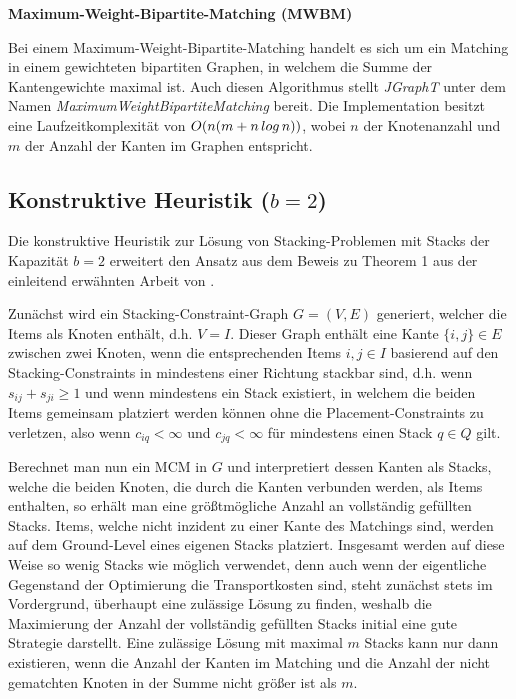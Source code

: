 \vfill
\pagebreak

\textbf{Maximum-Weight-Bipartite-Matching (MWBM)}

Bei einem Maximum-Weight-Bipartite-Matching handelt es sich um ein Matching in einem gewichteten bipartiten Graphen,
in welchem die Summe der Kantengewichte maximal ist. Auch diesen Algorithmus stellt \textit{JGraphT} \cite{JGraphT}
unter dem Namen \textit{MaximumWeightBipartiteMatching} bereit.
Die Implementation besitzt eine Laufzeitkomplexität von $O(n (m + n \thinspace log \thinspace n))$, wobei $n$ der Knotenanzahl
und $m$ der Anzahl der Kanten im Graphen entspricht.

\subsection{Konstruktive Heuristik ($b = 2$)}
\label{sec:two_cap_heuristic}

Die konstruktive Heuristik zur Lösung von Stacking-Problemen mit Stacks der Kapazität $b=2$ erweitert den Ansatz aus dem Beweis
zu Theorem 1 aus der einleitend erwähnten Arbeit von \citet{Bruns2015}.

Zunächst wird ein Stacking-Constraint-Graph $G = (V, E)$ generiert, welcher die Items als Knoten enthält, d.h. $V = I$. Dieser Graph
enthält eine Kante $\{i, j\} \in E$ zwischen zwei Knoten, wenn die entsprechenden Items $i, j \in I$ basierend auf den Stacking-Constraints
in mindestens einer Richtung stackbar sind, d.h. wenn $s_{ij} + s_{ji} \geq 1$ und wenn mindestens ein Stack existiert, in welchem die beiden Items gemeinsam platziert werden können ohne die Placement-Constraints zu verletzen, also wenn $c_{iq} < \infty$ und $c_{jq} < \infty$ für
mindestens einen Stack $q \in Q$ gilt.

Berechnet man nun ein \textsc{MCM} in $G$ und interpretiert dessen Kanten als Stacks, welche die beiden Knoten, die durch
die Kanten verbunden werden, als Items enthalten, so erhält man eine größtmögliche Anzahl an vollständig gefüllten Stacks.
Items, welche nicht inzident zu einer Kante des Matchings sind, werden auf dem Ground-Level eines eigenen Stacks platziert.
Insgesamt werden auf diese Weise so wenig Stacks wie möglich verwendet, denn auch wenn der eigentliche Gegenstand der Optimierung die Transportkosten sind, steht zunächst stets im Vordergrund, überhaupt eine zulässige Lösung zu finden, weshalb die Maximierung der Anzahl der vollständig gefüllten Stacks initial eine gute Strategie darstellt.
Eine zulässige Lösung mit maximal $m$ Stacks kann nur dann existieren, wenn die Anzahl der Kanten im Matching und die Anzahl der nicht gematchten Knoten in der Summe nicht größer ist als $m$.

